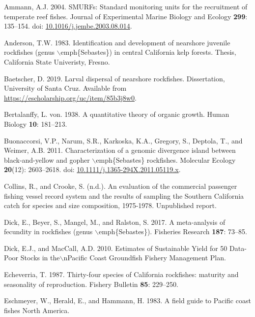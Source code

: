 \documentclass[12pt,]{article}
\begin{document}
\hypertarget{ref-Ammann2004}{}
Ammann, A.J. 2004. SMURFs: Standard monitoring units for the recruitment
of temperate reef fishes. Journal of Experimental Marine Biology and
Ecology \textbf{299}: 135--154. doi:
\href{https://doi.org/10.1016/j.jembe.2003.08.014}{10.1016/j.jembe.2003.08.014}.

\hypertarget{ref-Anderson1983}{}
Anderson, T.W. 1983. Identification and development of nearshore
juvenile rockfishes (genus \(\backslash\)emph\{Sebastes\}) in central
California kelp forests. Thesis, California State Univeristy, Fresno.

\hypertarget{ref-Baetscher2019}{}
Baetscher, D. 2019. Larval dispersal of nearshore rockfishes.
Dissertation, University of Santa Cruz. Available from
\url{https://escholarship.org/uc/item/85b3j8w0}.

\hypertarget{ref-vonB1938}{}
Bertalanffy, L. von. 1938. A quantitative theory of organic growth.
Human Biology \textbf{10}: 181--213.

\hypertarget{ref-Buonaccorsi2011}{}
Buonaccorsi, V.P., Narum, S.R., Karkoska, K.A., Gregory, S., Deptola,
T., and Weimer, A.B. 2011. Characterization of a genomic divergence
island between black-and-yellow and gopher
\(\backslash\)emph\{Sebastes\} rockfishes. Molecular Ecology
\textbf{20}(12): 2603--2618. doi:
\href{https://doi.org/10.1111/j.1365-294X.2011.05119.x}{10.1111/j.1365-294X.2011.05119.x}.

\hypertarget{ref-Collins1978}{}
Collins, R., and Crooke, S. (n.d.). An evaluation of the commercial
passenger fishing vessel record system and the results of sampling the
Southern California catch for species and size composition, 1975-1978.
Unpublished report.

\hypertarget{ref-Dick2017}{}
Dick, E., Beyer, S., Mangel, M., and Ralston, S. 2017. A meta-analysis
of fecundity in rockfishes (genus \(\backslash\)emph\{Sebastes\}).
Fisheries Research \textbf{187}: 73--85.

\hypertarget{ref-Dick2010}{}
Dick, E.J., and MacCall, A.D. 2010. Estimates of Sustainable Yield for
50 Data-Poor Stocks in the\(\backslash\)nPacific Coast Groundfish
Fishery Management Plan.

\hypertarget{ref-Echeverria1987}{}
Echeverria, T. 1987. Thirty-four species of California rockfishes:
maturity and seasonality of reproduction. Fishery Bulletin \textbf{85}:
229--250.

\hypertarget{ref-Eschmeyer1983}{}
Eschmeyer, W., Herald, E., and Hammann, H. 1983. A field guide to
Pacific coast fishes North America.
\end{document}
